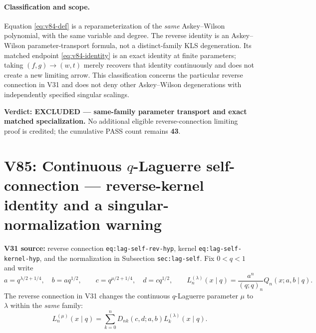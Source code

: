 \documentclass[11pt]{article}
\begin{document}
\paragraph{Classification and scope.}
Equation \eqref{eq:v84-def} is a reparameterization of the \emph{same} Askey--Wilson polynomial, with the same variable and degree. The reverse identity is an Askey--Wilson parameter-transport formula, not a distinct-family KLS degeneration. Its matched endpoint \eqref{eq:v84-identity} is an exact identity at finite parameters; taking $(f,g)\to(w,t)$ merely recovers that identity continuously and does not create a new limiting arrow. This classification concerns the particular reverse connection in V31 and does not deny other Askey--Wilson degenerations with independently specified singular scalings.

\noindent\textbf{Verdict: EXCLUDED --- same-family parameter transport and exact matched specialization.} No additional eligible reverse-connection limiting proof is credited; the cumulative PASS count remains \textbf{43}.


\section{V85: Continuous $q$-Laguerre self-connection --- reverse-kernel identity and a singular-normalization warning}
\noindent\textbf{V31 source:} reverse connection \texttt{eq:lag-self-rev-hyp}, kernel \texttt{eq:lag-self-kernel-hyp}, and the normalization in Subsection \texttt{sec:lag-self}.
Fix $0<q<1$ and write
\[
 a=q^{\lambda/2+1/4},\quad b=aq^{1/2},\qquad
 c=q^{\mu/2+1/4},\quad d=cq^{1/2},\qquad
 L_n^{(\lambda)}(x\mid q)=\frac{a^n}{(q;q)_n}Q_n(x;a,b\mid q).
\]
The reverse connection in V31 changes the continuous $q$-Laguerre parameter $\mu$ to $\lambda$ within the \emph{same} family:
\begin{equation}\label{eq:v85-reverse}
 L_n^{(\mu)}(x\mid q)=\sum_{k=0}^n D_{nk}(c,d;a,b)L_k^{(\lambda)}(x\mid q).
\end{equation}
\end{document}
